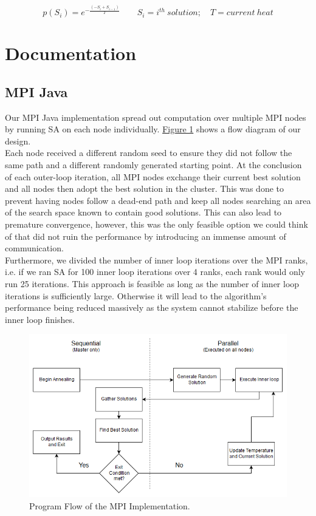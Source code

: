 \documentclass{article}
\begin{document}
		\begin{equation}\label{E_AP}
			p(S_i) = e^{-\frac{(-S_{i} + S_{i-1} )}{T}} \qquad S_i = i^{th}~solution; \quad T = current~heat
		\end{equation}
	
	\section{Documentation} \label{DOCUMENTATION}
		\subsection{MPI Java} \label{D_MPI}
			Our MPI Java implementation spread out computation over multiple MPI nodes by running SA on each node individually. \hyperref[F1]{Figure 1} shows a flow diagram of our design. \\
			
			Each node received a different random seed to ensure they did not follow the same path and a different randomly generated starting point. At the conclusion of each outer-loop iteration, all MPI nodes exchange their current best solution and all nodes then adopt the best solution in the cluster. This was done to prevent having nodes follow a dead-end path and keep all nodes searching an area of the search space known to contain good solutions. This can also lead to premature convergence, however, this was the only feasible option we could think of that did not ruin the performance by introducing an immense amount of communication. \\
			
			Furthermore, we divided the number of inner loop iterations over the MPI ranks, i.e. if we ran SA for 100 inner loop iterations over 4 ranks, each rank would only run 25 iterations. This approach is feasible as long as the number of inner loop iterations is sufficiently large. Otherwise it will lead to the algorithm's performance being reduced massively as the system cannot stabilize before the inner loop finishes.\\
		
			\begin{figure}\label{F1}
				\caption{Program Flow of the MPI Implementation.}
				\centering
				\includegraphics[scale=0.65]{mpi_flow.png}
			\end{figure}
		
\end{document}
